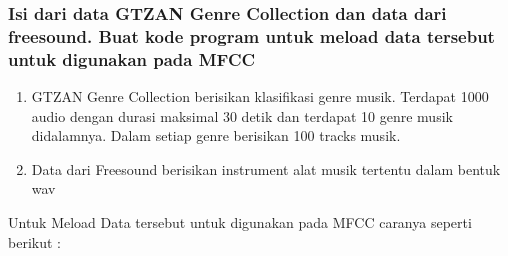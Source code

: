 \subsubsection{Isi dari data GTZAN Genre Collection dan data dari freesound. Buat kode program untuk meload data tersebut untuk digunakan pada MFCC}
\begin{enumerate}
\item GTZAN Genre Collection berisikan klasifikasi genre musik. Terdapat 1000 audio dengan durasi maksimal 30 detik dan terdapat 10 genre musik didalamnya. Dalam setiap genre berisikan 100 tracks musik.
\item Data dari Freesound berisikan instrument alat musik tertentu dalam bentuk wav
\end{enumerate}
Untuk Meload Data tersebut untuk digunakan pada MFCC caranya seperti berikut :
